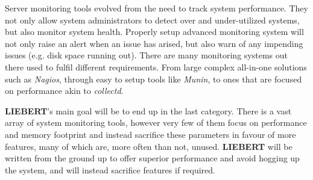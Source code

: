 \documentclass[12pt,a4paper,table]{article}
\begin{document}
            Server monitoring tools evolved from the need to track system performance. They not only allow system administrators to detect over and under-utilized systems, but also monitor system health. Properly setup advanced monitoring system will not only raise an alert when an issue has arised, but also warn of any impending issues (e.g. disk space running out). There are many monitoring systems out there used to fulfil different requirements. From large complex all-in-one solutions such as \textit{Nagios}, through easy to setup tools like \textit{Munin}, to ones that are focused on performance akin to \textit{collectd}.

            \textbf{LIEBERT}'s main goal will be to end up in the last category. There is a vast array of system monitoring tools, however very few of them focus on performance and memory footprint and instead sacrifice these parameters in favour of more features, many of which are, more often than not, unused. \textbf{LIEBERT} will be written from the ground up to offer superior performance and avoid hogging up the system, and will instead sacrifice features if required.
\end{document}
